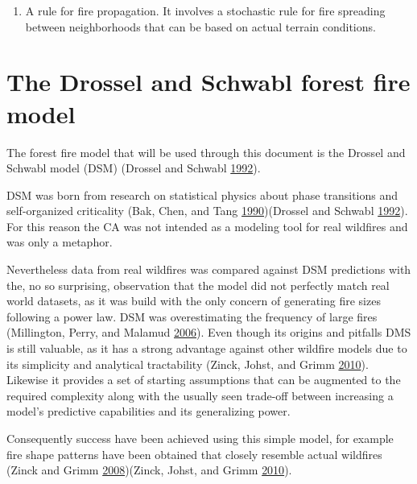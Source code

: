 \documentclass[
  openany]{book}
\providecommand{\tightlist}{%
  \setlength{\itemsep}{0pt}\setlength{\parskip}{0pt}}
\begin{document}
\begin{enumerate}
\def\labelenumi{\arabic{enumi}.}
\setcounter{enumi}{2}
\tightlist
\item
  A rule for fire propagation. It involves a stochastic rule for fire spreading between neighborhoods that can be based on actual terrain conditions.
\end{enumerate}

\hypertarget{the-drossel-and-schwabl-forest-fire-model}{%
\section{The Drossel and Schwabl forest fire model}\label{the-drossel-and-schwabl-forest-fire-model}}

The forest fire model that will be used through this document is the Drossel and Schwabl model (DSM) (Drossel and Schwabl \protect\hyperlink{ref-drossel1992self}{1992}).

DSM was born from research on statistical physics about phase transitions and self-organized criticality (Bak, Chen, and Tang \protect\hyperlink{ref-bak1990forest}{1990})(Drossel and Schwabl \protect\hyperlink{ref-drossel1992self}{1992}). For this reason the CA was not intended as a modeling tool for real wildfires and was only a metaphor.

Nevertheless data from real wildfires was compared against DSM predictions with the, no so surprising, observation that the model did not perfectly match real world datasets, as it was build with the only concern of generating fire sizes following a power law. DSM was overestimating the frequency of large fires (Millington, Perry, and Malamud \protect\hyperlink{ref-millington2006models}{2006}). Even though its origins and pitfalls DMS is still valuable, as it has a strong advantage against other wildfire models due to its simplicity and analytical tractability (Zinck, Johst, and Grimm \protect\hyperlink{ref-zinck2010wildfire}{2010}). Likewise it provides a set of starting assumptions that can be augmented to the required complexity along with the usually seen trade-off between increasing a model's predictive capabilities and its generalizing power.

Consequently success have been achieved using this simple model, for example fire shape patterns have been obtained that closely resemble actual wildfires (Zinck and Grimm \protect\hyperlink{ref-zinck2008more}{2008})(Zinck, Johst, and Grimm \protect\hyperlink{ref-zinck2010wildfire}{2010}).
\end{document}
